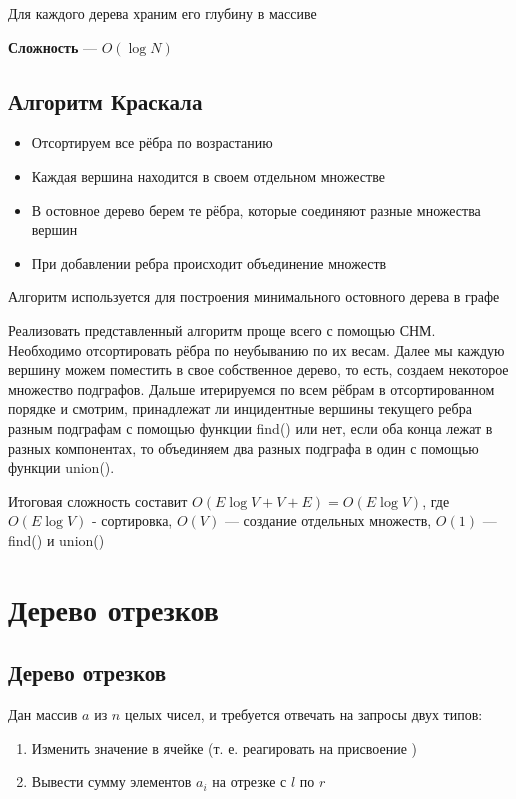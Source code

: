 \documentclass[a4paper]{article}
\begin{document}
Для каждого дерева храним его глубину в массиве

\textbf{Сложность} — $O(\log N)$

\subsection{Алгоритм Краскала}
\begin{itemize}
    \item Отсортируем все рёбра по возрастанию
    \item Каждая вершина находится в своем отдельном множестве
    \item В остовное дерево берем те рёбра, которые соединяют разные множества вершин
    \item При добавлении ребра происходит объединение множеств
\end{itemize}

Алгоритм используется для построения минимального остовного дерева в графе

Реализовать представленный алгоритм проще всего с помощью СНМ. Необходимо отсортировать рёбра по неубыванию по их весам. Далее мы каждую вершину можем поместить в свое собственное дерево, то есть, создаем некоторое множество подграфов. Дальше итерируемся по всем рёбрам в отсортированном порядке и смотрим, принадлежат ли инцидентные вершины текущего ребра разным подграфам с помощью функции find() или нет, если оба конца лежат в разных компонентах, то объединяем два разных подграфа в один с помощью функции union().

Итоговая сложность составит $O(E\log V+V+E)=O(E\log V)$, где $O(E\log V)$ - сортировка, $O(V)$ — создание отдельных множеств, $O(1)$ — find() и union()

\newpage
\section{Дерево отрезков}
\subsection{Дерево отрезков}
Дан массив $a$ из $n$ целых чисел, и требуется отвечать на запросы двух типов:

\begin{enumerate}
    \item Изменить значение в ячейке (т. е. реагировать на присвоение )
    \item Вывести сумму элементов $a_i$ на отрезке с $l$ по $r$
\end{enumerate}
\end{document}

